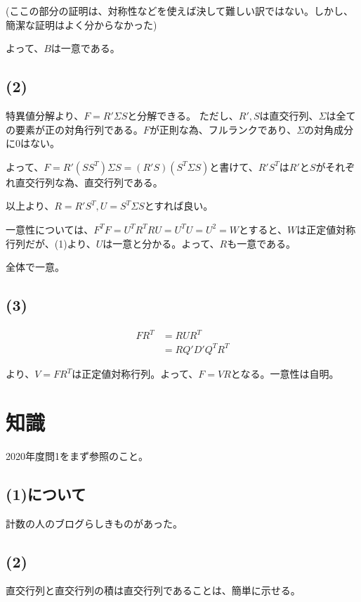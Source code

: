 \documentclass[a4paper, 10pt, dvipdfmx]{jlreq}
\begin{document}
(ここの部分の証明は、対称性などを使えば決して難しい訳ではない。しかし、簡潔な証明はよく分からなかった)

よって、$B$は一意である。

\subsection*{(2)}

特異値分解より、$F=R' \Sigma S$と分解できる。
ただし、$R',S$は直交行列、$\Sigma$は全ての要素が正の対角行列である。$F$が正則な為、フルランクであり、$\Sigma$の対角成分に0はない。

よって、$F=R' (SS^T) \Sigma S=(R'S)(S^T\Sigma S) $と書けて、$R' S^T$は$R'$と$S$がそれぞれ直交行列な為、直交行列である。

以上より、$R=R' S^T,U=S^T \Sigma S$とすれば良い。

一意性については、$F^TF=U^TR^TRU=U^TU=U^2=W$とすると、$W$は正定値対称行列だが、(1)より、$U$は一意と分かる。よって、$R$も一意である。

全体で一意。

\subsection*{(3)}

\begin{align*}
  FR^T & =RUR^T       \\
       & =RQ'D'Q^TR^T
\end{align*}

より、$V=FR^T$は正定値対称行列。よって、$F=VR$となる。一意性は自明。

\section{知識}

2020年度問1をまず参照のこと。

\subsection*{(1)について}

計数の人のブログらしきものがあった。\cite{site:2}

\subsection*{(2)}

直交行列と直交行列の積は直交行列であることは、簡単に示せる。
\end{document}
